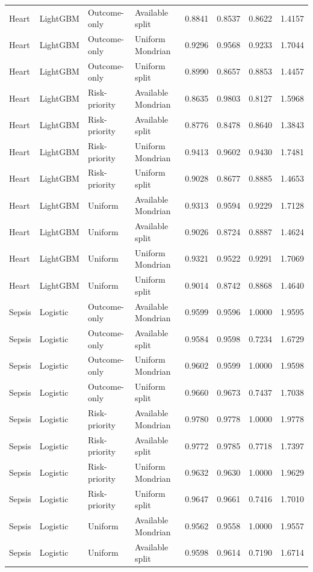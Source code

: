 \begin{longtable}{L{1cm}L{1.6cm}L{2.5cm}L{3.1cm}rrrr}
Heart & LightGBM & Outcome-only & Available split & 0.8841 & 0.8537 & 0.8622 & 1.4157 \\
Heart & LightGBM & Outcome-only & Uniform Mondrian & 0.9296 & 0.9568 & 0.9233 & 1.7044 \\
Heart & LightGBM & Outcome-only & Uniform split & 0.8990 & 0.8657 & 0.8853 & 1.4457 \\
Heart & LightGBM & Risk-priority & Available Mondrian & 0.8635 & 0.9803 & 0.8127 & 1.5968 \\
Heart & LightGBM & Risk-priority & Available split & 0.8776 & 0.8478 & 0.8640 & 1.3843 \\
Heart & LightGBM & Risk-priority & Uniform Mondrian & 0.9413 & 0.9602 & 0.9430 & 1.7481 \\
Heart & LightGBM & Risk-priority & Uniform split & 0.9028 & 0.8677 & 0.8885 & 1.4653 \\
Heart & LightGBM & Uniform & Available Mondrian & 0.9313 & 0.9594 & 0.9229 & 1.7128 \\
Heart & LightGBM & Uniform & Available split & 0.9026 & 0.8724 & 0.8887 & 1.4624 \\
Heart & LightGBM & Uniform & Uniform Mondrian & 0.9321 & 0.9522 & 0.9291 & 1.7069 \\
Heart & LightGBM & Uniform & Uniform split & 0.9014 & 0.8742 & 0.8868 & 1.4640 \\
Sepsis & Logistic & Outcome-only & Available Mondrian & 0.9599 & 0.9596 & 1.0000 & 1.9595 \\
Sepsis & Logistic & Outcome-only & Available split & 0.9584 & 0.9598 & 0.7234 & 1.6729 \\
Sepsis & Logistic & Outcome-only & Uniform Mondrian & 0.9602 & 0.9599 & 1.0000 & 1.9598 \\
Sepsis & Logistic & Outcome-only & Uniform split & 0.9660 & 0.9673 & 0.7437 & 1.7038 \\
Sepsis & Logistic & Risk-priority & Available Mondrian & 0.9780 & 0.9778 & 1.0000 & 1.9778 \\
Sepsis & Logistic & Risk-priority & Available split & 0.9772 & 0.9785 & 0.7718 & 1.7397 \\
Sepsis & Logistic & Risk-priority & Uniform Mondrian & 0.9632 & 0.9630 & 1.0000 & 1.9629 \\
Sepsis & Logistic & Risk-priority & Uniform split & 0.9647 & 0.9661 & 0.7416 & 1.7010 \\
Sepsis & Logistic & Uniform & Available Mondrian & 0.9562 & 0.9558 & 1.0000 & 1.9557 \\
Sepsis & Logistic & Uniform & Available split & 0.9598 & 0.9614 & 0.7190 & 1.6714 \\

\end{longtable}

